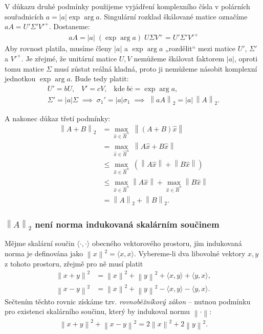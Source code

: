 \documentclass[]{article}
\newcommand{\norm}[1]{\left\lVert#1\right\rVert}
\begin{document}
V důkazu druhé podmínky použijeme vyjádření komplexního čísla v polárních souřadnicích $a = |a| \exp \arg a$. Singulární rozklad škálované matice označíme $aA = U' \Sigma' {V'}^+$. Dostaneme:
\begin{align*}
  aA = |a| \; (\exp \arg a) \; U \Sigma V^+ = U' \Sigma' {V'}^+
\end{align*}
Aby rovnost platila, musíme členy $|a|$ a $\exp \arg a$ „rozdělit“ mezi matice $U'$, $\Sigma'$ a ${V'}^+$. Je zřejmé, že unitární matice $U,V$ nemůžeme škálovat faktorem $|a|$, oproti tomu matice $\Sigma$ musí zůstat reálná kladná, proto ji nemůžeme násobit komplexní jednotkou $\exp \arg a$. Bude tedy platit:
\begin{gather*}
  U' = bU, \;\;\; V' = cV, \;\;\; \mathrm{kde} \; b \overline{c} = \exp \arg a, \\
  \Sigma' = |a| \Sigma
  \; \implies \;
  \sigma_1' = |a| \sigma_1
  \; \implies \;
  \norm{aA}_2 = |a| \, \norm{A}_2.
\end{gather*}

A nakonec důkaz třetí podmínky:
\begin{align*}
  \norm{A+B}_2
  &= \max_{\widehat{x} \in \widehat{R}^n} \; \norm{(A+B)\widehat{x}} \\
  &= \max_{\widehat{x} \in \widehat{R}^n} \; \norm{A\widehat{x} + B\widehat{x}} \\
  &\leq \max_{\widehat{x} \in \widehat{R}^n} \; \left( \norm{A\widehat{x}} + \norm{B\widehat{x}} \right) \\
  &\leq \max_{\widehat{x} \in \widehat{R}^n} \norm{A\widehat{x}} + \max_{\widehat{x} \in \widehat{R}^n} \norm{B\widehat{x}} \\
  &= \norm{A}_2 + \norm{B}_2.
\end{align*}

\subsubsection[neindukovana]{$\norm{A}_2$ není norma indukovaná skalárním součinem}
Mějme skalární součin $\langle \cdot, \cdot \rangle$ obecného vektorového prostoru, jím indukovaná norma je definována jako $\norm{x}^2 = \langle x, x \rangle$. Vybereme-li dva libovolné vektory $x,y$ z tohoto prostoru, zřejmě pro ně musí platit
\begin{align*}
  \norm{x+y}^2 &= \norm{x}^2 + \norm{y}^2 + \langle x, y \rangle + \langle y, x \rangle, \\
  \norm{x-y}^2 &= \norm{x}^2 + \norm{y}^2 - \langle x, y \rangle - \langle y, x \rangle.
\end{align*}
Sečtením těchto rovnic získáme tzv. \textit{rovnoběžníkový zákon} – nutnou podmínku pro existenci skalárního součinu, který by indukoval normu $\norm\cdot$:
\begin{align*}
  \norm{x+y}^2 + \norm{x-y}^2 = 2\norm{x}^2 + 2 \norm{y}^2.
\end{align*}
\end{document}
